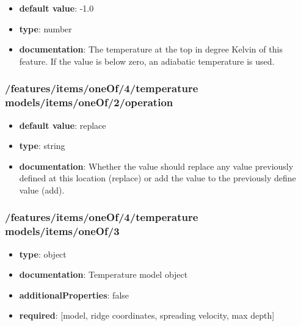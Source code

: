 \begin{itemize}\item {\bf default value}: -1.0
\item {\bf type}: number
\item {\bf documentation}: The temperature at the top in degree Kelvin of this feature. If the value is below zero, an adiabatic temperature is used.
\end{itemize}\subsubsection{/features/items/oneOf/4/temperature models/items/oneOf/2/operation}
\begin{itemize}\item {\bf default value}: replace
\item {\bf type}: string
\item {\bf documentation}: Whether the value should replace any value previously defined at this location (replace) or add the value to the previously define value (add).
\end{itemize}\subsubsection{/features/items/oneOf/4/temperature models/items/oneOf/3}
\begin{itemize}\item {\bf type}: object
\item {\bf documentation}: Temperature model object
\item {\bf additionalProperties}: false
\item {\bf required}: [model, ridge coordinates, spreading velocity, max depth]\end{itemize}
